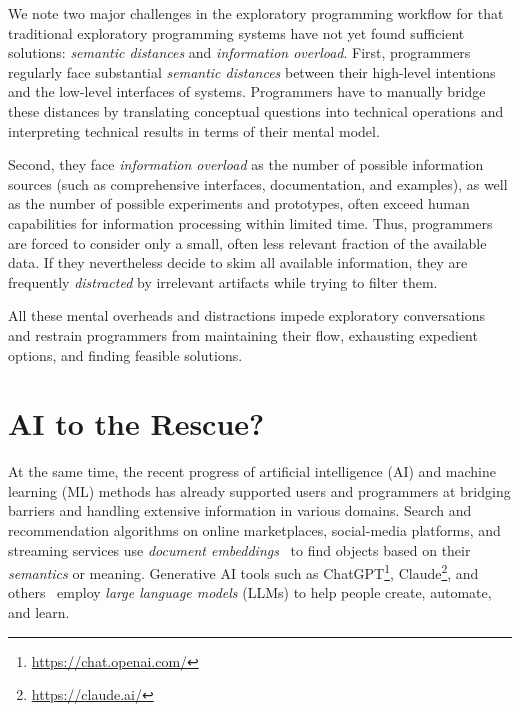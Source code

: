 We note two major challenges in the exploratory programming workflow for that traditional exploratory programming systems have not yet found sufficient solutions: \emph{semantic distances} and \emph{information overload}.
First, programmers regularly face substantial \emph{semantic distances} between their high-level intentions and the low-level interfaces of systems.
Programmers have to manually bridge these distances by translating conceptual questions into technical operations and interpreting technical results in terms of their mental model.

Second, they face \emph{information overload} as the number of possible information sources (such as comprehensive interfaces, documentation, and examples), as well as the number of possible experiments and prototypes, often exceed human capabilities for information processing within limited time.
Thus, programmers are forced to consider only a small, often less relevant fraction of the available data.
If they nevertheless decide to skim all available information, they are frequently \emph{distracted} by irrelevant artifacts while trying to filter them.

All these mental overheads and distractions impede exploratory conversations and restrain programmers from maintaining their flow, exhausting expedient options, and finding feasible solutions.

\section*{AI to the Rescue?}

At the same time, the recent progress of artificial intelligence (AI) and machine learning (ML) methods has already supported users and programmers at bridging barriers and handling extensive information in various domains.
Search and recommendation algorithms on online marketplaces, social-media platforms, and streaming services use \emph{document embeddings}~\cite{mikolov2013efficient,devlin2019bert} to find objects based on their \emph{semantics} or meaning. %
Generative AI tools such as ChatGPT\footnote{\url{https://chat.openai.com/}}, Claude\footnote{\url{https://claude.ai/}}, and others~\cite{vaswani2017attention,radford2018improving,zhao2023survey} employ \emph{large language models} (LLMs) to help people create, automate, and learn. %

